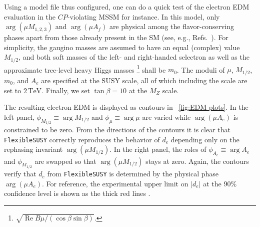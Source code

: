 \documentclass[final,3p,11pt,pdflatex]{elsarticle}
\makeatletter
\newcommand{\fs}{\texttt{FlexibleSUSY}\@\xspace}
\newcommand{\unit}[1]{\,\text{#1}}      %
\newcommand{\edm}[1]{\ensuremath{d_{#1}}\xspace}
\newcommand{\figref}[1]{\figurename~\ref{#1}}
\newcommand{\CP}{\ensuremath{CP}\xspace}
\newcommand{\mhalf}{\ensuremath{M_{1/2}}\xspace}
\newcommand{\mzero}{\ensuremath{m_0}\xspace}
\DeclareMathOperator{\re}{Re}
\makeatother
\begin{document}
Using a model file thus configured, one can do a quick test of
the electron EDM evaluation in the \CP-violating MSSM for instance.
In this model, only $\arg(\mu M_{1,2,3})$ and $\arg (\mu A_f)$ are
physical among the flavor-conserving phases
apart from those already present in the SM
(see, e.g., Refs.~\cite{Pokorski:1999hz,Stockinger:2006zn}).
For simplicity,
the gaugino masses are assumed to have an equal (complex) value
$\mhalf$, and both soft masses of the left- and right-handed
selectron as well as the approximate tree-level heavy Higgs masses%
\footnote{$\sqrt{\re\!B\mu / (\cos\!\beta \sin\!\beta)}$.}
shall be $\mzero$.
The moduli of $\mu$, $\mhalf$, $\mzero$, and $A_e$
are specified at the SUSY scale,
all of which including the scale are set to $2\unit{TeV}$.
Finally, we set $\tan\beta = 10$ at the $M_Z$ scale.

The resulting electron EDM is displayed as contours in
\figref{fig:EDM plots}.
In the left panel, $\phi_{\mhalf} \equiv \arg \mhalf$ and
$\phi_\mu \equiv \arg \mu$ are varied
while $\arg(\mu A_e)$ is constrained to be zero.
From the directions of the contours it is clear
that \fs correctly reproduces the behavior of
$\edm{e}$ depending only on the rephasing invariant $\arg(\mu \mhalf)$.
In the right panel, the roles of $\phi_{A_e} \equiv \arg A_e$ and
$\phi_{\mhalf}$ are swapped so that $\arg(\mu \mhalf)$ stays at zero.
Again, the contours verify that
$\edm{e}$ from \fs is determined by the physical phase $\arg(\mu A_e)$.
For reference,
the experimental upper limit on $|\edm{e}|$ at the 90\% confidence level
is shown as the thick red lines \cite{Baron:2013eja}.
\end{document}
